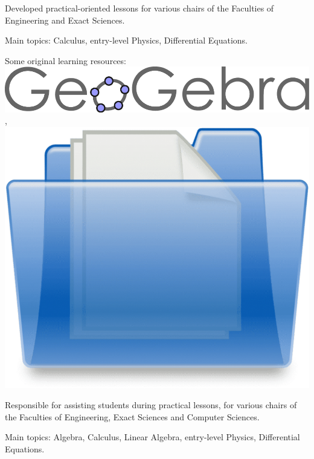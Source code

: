 \begin{zitemize}
\item Developed practical-oriented lessons for various chairs of the Faculties of Engineering and Exact Sciences.
\item Main topics: Calculus, entry-level Physics, Differential Equations.
\item Some original learning resources: \href{https://www.geogebra.org/u/juanjogervasio}{\includegraphics[scale=0.15]{Geogebra-logo.png}} , \href{https://drive.google.com/drive/folders/1O8sMBLMmO2oliVsF-9rBn2s2qDtSGJUr?usp=sharing}{\includegraphics[scale=0.01]{folder.png}}
\end{zitemize}

\begin{zitemize}
\item Responsible for assisting students during practical lessons, for various chairs of the Faculties of Engineering, Exact Sciences and Computer Sciences.
\item Main topics: Algebra, Calculus, Linear Algebra, entry-level Physics, Differential Equations.
\end{zitemize}

